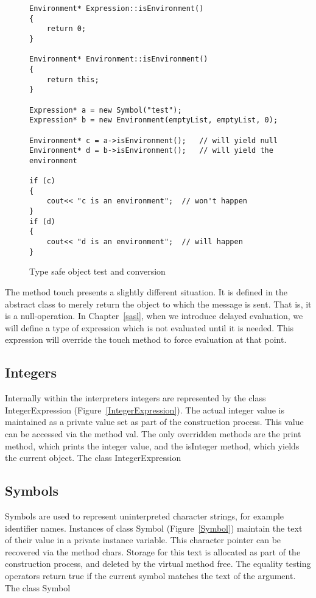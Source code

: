 \begin{figure}
\begin{lstlisting}
Environment* Expression::isEnvironment()
{
    return 0;
}

Environment* Environment::isEnvironment()
{
    return this;
}

Expression* a = new Symbol("test");
Expression* b = new Environment(emptyList, emptyList, 0);

Environment* c = a->isEnvironment();   // will yield null
Environment* d = b->isEnvironment();   // will yield the environment

if (c)
{
    cout<< "c is an environment";  // won't happen
}
if (d)
{
    cout<< "d is an environment";  // will happen
}
\end{lstlisting}
\caption{Type safe object test and conversion}
\label{isEnvironment}
\end{figure}

The method {\sf touch} presents a slightly different situation.  It is defined
in the abstract class to merely return the object to which the message is sent.
That is, it is a null-operation.  In Chapter~\ref{sasl}, when we introduce
delayed evaluation, we will define a type of expression which is not evaluated
until it is needed.  This expression will override the touch method to force
evaluation at that point.

\subsection{Integers}

Internally within the interpreters integers are represented by the class {\sf
    IntegerExpression} (Figure~\ref{IntegerExpression}).  The actual integer
value is maintained as a private value set as part of the construction process.
This value can be accessed via the method {\sf val}.  The only overridden
methods are the {\sf print} method, which prints the integer value, and the {\sf
    isInteger} method, which yields the current object.
%
{The class {\sf IntegerExpression}}

\subsection{Symbols}

Symbols are used to represent uninterpreted character strings, for example
identifier names.  Instances of class {\sf Symbol} (Figure~\ref{Symbol})
maintain the text of their value in a private instance variable.  This character
pointer can be recovered via the method {\sf chars}.  Storage for this text is
allocated as part of the construction process, and deleted by the virtual method
{\sf free}.  The equality testing operators return true if the current symbol
matches the text of the argument.
%
{The class {\sf Symbol}}

